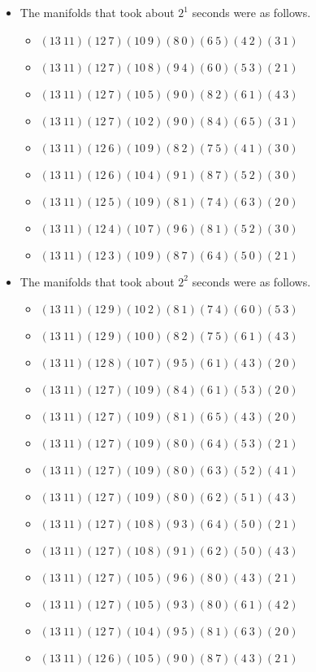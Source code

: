 \documentclass{article}
\begin{document}
\begin{itemize}
\item The manifolds that took about $2^{1}$ seconds were as follows.
\begin{itemize}
\item $(13\ 11)(12\ 7)(10\ 9)(8\ 0)(6\ 5)(4\ 2)(3\ 1)$
\item $(13\ 11)(12\ 7)(10\ 8)(9\ 4)(6\ 0)(5\ 3)(2\ 1)$
\item $(13\ 11)(12\ 7)(10\ 5)(9\ 0)(8\ 2)(6\ 1)(4\ 3)$
\item $(13\ 11)(12\ 7)(10\ 2)(9\ 0)(8\ 4)(6\ 5)(3\ 1)$
\item $(13\ 11)(12\ 6)(10\ 9)(8\ 2)(7\ 5)(4\ 1)(3\ 0)$
\item $(13\ 11)(12\ 6)(10\ 4)(9\ 1)(8\ 7)(5\ 2)(3\ 0)$
\item $(13\ 11)(12\ 5)(10\ 9)(8\ 1)(7\ 4)(6\ 3)(2\ 0)$
\item $(13\ 11)(12\ 4)(10\ 7)(9\ 6)(8\ 1)(5\ 2)(3\ 0)$
\item $(13\ 11)(12\ 3)(10\ 9)(8\ 7)(6\ 4)(5\ 0)(2\ 1)$
\end{itemize}
\item The manifolds that took about $2^{2}$ seconds were as follows.
\begin{itemize}
\item $(13\ 11)(12\ 9)(10\ 2)(8\ 1)(7\ 4)(6\ 0)(5\ 3)$
\item $(13\ 11)(12\ 9)(10\ 0)(8\ 2)(7\ 5)(6\ 1)(4\ 3)$
\item $(13\ 11)(12\ 8)(10\ 7)(9\ 5)(6\ 1)(4\ 3)(2\ 0)$
\item $(13\ 11)(12\ 7)(10\ 9)(8\ 4)(6\ 1)(5\ 3)(2\ 0)$
\item $(13\ 11)(12\ 7)(10\ 9)(8\ 1)(6\ 5)(4\ 3)(2\ 0)$
\item $(13\ 11)(12\ 7)(10\ 9)(8\ 0)(6\ 4)(5\ 3)(2\ 1)$
\item $(13\ 11)(12\ 7)(10\ 9)(8\ 0)(6\ 3)(5\ 2)(4\ 1)$
\item $(13\ 11)(12\ 7)(10\ 9)(8\ 0)(6\ 2)(5\ 1)(4\ 3)$
\item $(13\ 11)(12\ 7)(10\ 8)(9\ 3)(6\ 4)(5\ 0)(2\ 1)$
\item $(13\ 11)(12\ 7)(10\ 8)(9\ 1)(6\ 2)(5\ 0)(4\ 3)$
\item $(13\ 11)(12\ 7)(10\ 5)(9\ 6)(8\ 0)(4\ 3)(2\ 1)$
\item $(13\ 11)(12\ 7)(10\ 5)(9\ 3)(8\ 0)(6\ 1)(4\ 2)$
\item $(13\ 11)(12\ 7)(10\ 4)(9\ 5)(8\ 1)(6\ 3)(2\ 0)$
\item $(13\ 11)(12\ 6)(10\ 5)(9\ 0)(8\ 7)(4\ 3)(2\ 1)$

\end{itemize}
\end{itemize}
\end{document}
